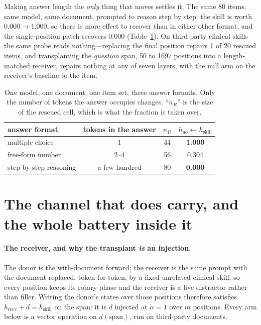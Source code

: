 \documentclass{article}
\newcommand{\dvec}{\ensuremath{d}}
\begin{document}
Making answer length the \emph{only} thing that moves settles it. The same 80
items, same model, same document, prompted to reason step by step: the skill is
worth $0.000 \to 1.000$, so there is more effect to recover than in either other
format, and the single-position patch recovers $\mathbf{0.000}$
(Table~\ref{tab:ladder2}). On third-party clinical skills the same probe reads
nothing---replacing the final position repairs 1 of 20 rescued items, and
transplanting the \emph{question} span, 50 to 1697 positions into a
length-matched receiver, repairs nothing at any of seven layers, with the null
arm on the receiver's baseline to the item.

\begin{table}[t]
\caption{One model, one document, one item set, three answer formats. Only the
number of tokens the answer occupies changes. ``$n_R$'' is the size of the
rescued cell, which is what the fraction is taken over.}
\label{tab:ladder2}
\centering
\small
\begin{tabular}{lccc}
\toprule
answer format & tokens in the answer & $n_R$ & $h_{\text{no}} \leftarrow h_{\text{skill}}$ \\
\midrule
multiple choice        & 1            & 44 & \textbf{1.000} \\
free-form number       & 2--4         & 56 & 0.304 \\
step-by-step reasoning & a few hundred & 80 & \textbf{0.000} \\
\bottomrule
\end{tabular}
\end{table}

\section{The channel that does carry, and the whole battery inside it}
\label{sec:battery}

\paragraph{The receiver, and why the transplant \emph{is} an injection.} The
donor is the with-document forward; the receiver is the same prompt with the
document replaced, token for token, by a fixed unrelated clinical skill, so
every position keeps its rotary phase and the receiver is a live distractor
rather than filler. Writing the donor's states over those positions therefore
satisfies $h_{\text{recv}} + \dvec = h_{\text{skill}}$ on the span: it is $\dvec$ injected at $\alpha=1$ over $m$
positions. Every arm below is a vector operation on $\dvec(\text{span})$, run on
third-party documents.
\end{document}
